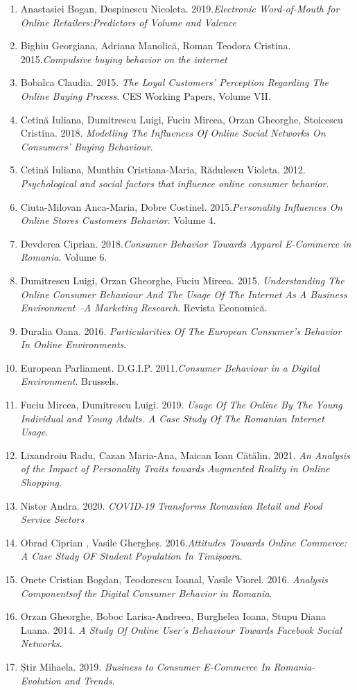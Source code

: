 \documentclass[a4paper, 12pt]{article}
\begin{document}
	\begin{enumerate}[1.]
		\item Anastasiei Bogan, Dospinescu Nicoleta. 2019.\textit{Electronic Word-of-Mouth for Online Retailers:Predictors of Volume and Valence}
		\item Bighiu Georgiana, Adriana Manolică, Roman Teodora Cristina. 2015.\textit{Compulsive buying behavior on the internet}
		\item Bobalca Claudia. 2015. \textit{The Loyal Customers’ Perception Regarding The Online Buying Process}. CES Working Papers, Volume VII.
		\item Cetină Iuliana, Dumitrescu Luigi, Fuciu Mircea, Orzan Gheorghe, Stoicescu Cristina. 2018. \textit{Modelling The Influences Of Online Social Networks On Consumers’ Buying Behaviour}.
		\item Cetină Iuliana, Munthiu Cristiana-Maria, Rădulescu Violeta. 2012. \textit{Psychological and social factors that influence online consumer
			behavior}.
		\item Ciuta-Milovan Anca-Maria, Dobre Costinel. 2015.\textit{Personality Influences On Online Stores Customers Behavior}. Volume 4.
		\item Devderea Ciprian. 2018.\textit{Consumer Behavior Towards Apparel E-Commerce in Romania}. Volume 6.
		\item Dumitrescu Luigi, Orzan Gheorghe, Fuciu Mircea. 2015. \textit{Understanding The Online Consumer Behaviour And The Usage Of The Internet As A Business Environment –A Marketing Research}. Revista Economică.
		\item Duralia Oana. 2016. \textit{Particularities Of The European Consumer’s
			Behavior In Online Environments}.
		\item European Parliament. D.G.I.P. 2011.\textit{Consumer Behaviour in a Digital Environment}. Brussels.
		\item Fuciu Mircea, Dumitrescu Luigi. 2019. \textit{Usage Of The Online By The Young Individual and Young Adults. A Case Study Of The Romanian Internet Usage}.
		\item Lixandroiu Radu, Cazan Maria-Ana, Maican Ioan Cătălin. 2021. \textit{An Analysis of the Impact of Personality Traits towards Augmented Reality in Online Shopping}.
		\item Nistor Andra. 2020. \textit{COVID-19 Transforms Romanian Retail and Food Service Sectors}
		\item Obrad Ciprian , Vasile Ghergheș. 2016.\textit{Attitudes Towards Online Commerce: A Case Study OF Student Population In Timișoara}.
		\item Onete Cristian Bogdan, Teodorescu Ioanal, Vasile Viorel. 2016. \textit{Analysis Componentsof the Digital Consumer Behavior in Romania}.
		\item Orzan Gheorghe, Boboc Larisa-Andreea, Burghelea Ioana, Stupu Diana Luana. 2014. \textit{A Study Of Online User’s Behaviour Towards Facebook Social Networks}.
		\item Știr Mihaela. 2019. \textit{Business to Consumer E-Commerce In Romania-Evolution and Trends}.
	\end{enumerate}
\end{document}
